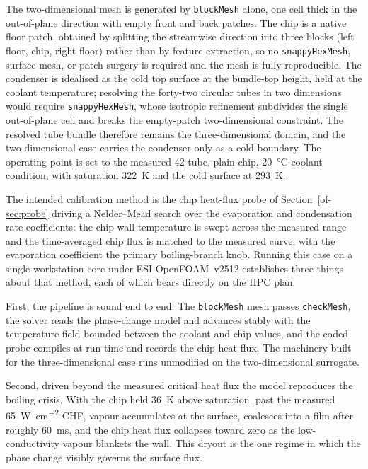 \documentclass[11pt]{article}
\begin{document}
The two-dimensional mesh is generated by \texttt{blockMesh} alone, one cell thick in the
out-of-plane direction with empty front and back patches. The chip is a native floor patch,
obtained by splitting the streamwise direction into three blocks (left floor, chip, right
floor) rather than by feature extraction, so no \texttt{snappyHexMesh}, surface mesh, or
patch surgery is required and the mesh is fully reproducible. The condenser is idealised as
the cold top surface at the bundle-top height, held at the coolant temperature; resolving the
forty-two circular tubes in two dimensions would require \texttt{snappyHexMesh}, whose
isotropic refinement subdivides the single out-of-plane cell and breaks the empty-patch
two-dimensional constraint. The resolved tube bundle therefore remains the three-dimensional
domain, and the two-dimensional case carries the condenser only as a cold boundary. The
operating point is set to the measured 42-tube, plain-chip, \SI{20}{\celsius}-coolant
condition, with saturation \SI{322}{\kelvin} and the cold surface at \SI{293}{\kelvin}.

The intended calibration method is the chip heat-flux probe of Section~\ref{of-sec:probe} driving
a Nelder--Mead search over the evaporation and condensation rate coefficients: the chip wall
temperature is swept across the measured range and the time-averaged chip flux is matched to the
measured curve, with the evaporation coefficient the primary boiling-branch knob. Running this
case on a single workstation core under ESI OpenFOAM~v2512 establishes three things about that
method, each of which bears directly on the HPC plan.

First, the pipeline is sound end to end. The \texttt{blockMesh} mesh passes \texttt{checkMesh},
the solver reads the phase-change model and advances stably with the temperature field bounded
between the coolant and chip values, and the coded probe compiles at run time and records the
chip heat flux. The machinery built for the three-dimensional case runs unmodified on the
two-dimensional surrogate.

Second, driven beyond the measured critical heat flux the model reproduces the boiling crisis.
With the chip held \SI{36}{\kelvin} above saturation, past the measured
\SI{65}{\watt\per\centi\meter\squared} CHF, vapour accumulates at the surface, coalesces into a
film after roughly \SI{60}{\milli\second}, and the chip heat flux collapses toward zero as the
low-conductivity vapour blankets the wall. This dryout is the one regime in which the phase
change visibly governs the surface flux.
\end{document}
